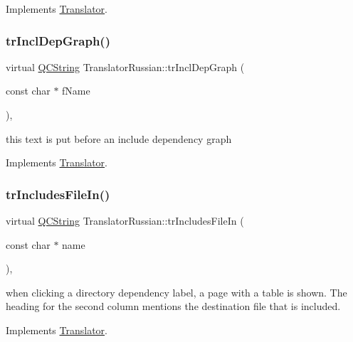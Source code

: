 Implements \mbox{\hyperlink{class_translator}{Translator}}.

\mbox{\label{class_translator_russian_aca573fccb88f326bece1f90098e09427}} 
\subsubsection{\texorpdfstring{trInclDepGraph()}{trInclDepGraph()}}
{\footnotesize\ttfamily virtual \mbox{\hyperlink{class_q_c_string}{Q\+C\+String}} Translator\+Russian\+::tr\+Incl\+Dep\+Graph (\begin{DoxyParamCaption}\item[{const char $\ast$}]{f\+Name }\end{DoxyParamCaption})\hspace{0.3cm}{\ttfamily [inline]}, {\ttfamily [virtual]}}

this text is put before an include dependency graph 

Implements \mbox{\hyperlink{class_translator}{Translator}}.

\mbox{\label{class_translator_russian_af26b6c0b5f0bf7e300ecb7b4a6605149}} 
\subsubsection{\texorpdfstring{trIncludesFileIn()}{trIncludesFileIn()}}
{\footnotesize\ttfamily virtual \mbox{\hyperlink{class_q_c_string}{Q\+C\+String}} Translator\+Russian\+::tr\+Includes\+File\+In (\begin{DoxyParamCaption}\item[{const char $\ast$}]{name }\end{DoxyParamCaption})\hspace{0.3cm}{\ttfamily [inline]}, {\ttfamily [virtual]}}

when clicking a directory dependency label, a page with a table is shown. The heading for the second column mentions the destination file that is included. 

Implements \mbox{\hyperlink{class_translator}{Translator}}.

